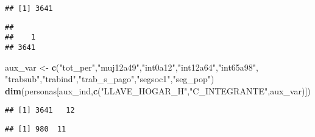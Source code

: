 \documentclass[11pt,]{article}
\newenvironment{Shaded}{\begin{snugshade}}{\end{snugshade}}
\newcommand{\KeywordTok}[1]{\textcolor[rgb]{0.13,0.29,0.53}{\textbf{#1}}}
\newcommand{\DataTypeTok}[1]{\textcolor[rgb]{0.13,0.29,0.53}{#1}}
\newcommand{\StringTok}[1]{\textcolor[rgb]{0.31,0.60,0.02}{#1}}
\newcommand{\OperatorTok}[1]{\textcolor[rgb]{0.81,0.36,0.00}{\textbf{#1}}}
\newcommand{\NormalTok}[1]{#1}
\begin{document}
\begin{verbatim}
## [1] 3641
\end{verbatim}

\begin{Shaded}
\end{Shaded}

\begin{verbatim}
## 
##    1 
## 3641
\end{verbatim}

\begin{Shaded}
\begin{Highlighting}[]
\NormalTok{aux_var <-}\StringTok{ }\KeywordTok{c}\NormalTok{(}\StringTok{"tot_per"}\NormalTok{,}\StringTok{"muj12a49"}\NormalTok{,}\StringTok{"int0a12"}\NormalTok{,}\StringTok{"int12a64"}\NormalTok{,}\StringTok{"int65a98"}\NormalTok{,}
             \StringTok{"trabsub"}\NormalTok{,}\StringTok{"trabind"}\NormalTok{,}\StringTok{"trab_s_pago"}\NormalTok{,}\StringTok{"segsoc1"}\NormalTok{,}\StringTok{"seg_pop"}\NormalTok{)}
\KeywordTok{dim}\NormalTok{(personas[aux_ind,}\KeywordTok{c}\NormalTok{(}\StringTok{"LLAVE_HOGAR_H"}\NormalTok{,}\StringTok{"C_INTEGRANTE"}\NormalTok{,aux_var)])}
\end{Highlighting}
\end{Shaded}

\begin{verbatim}
## [1] 3641   12
\end{verbatim}

\begin{Shaded}
\end{Shaded}

\begin{verbatim}
## [1] 980  11
\end{verbatim}
\end{document}
